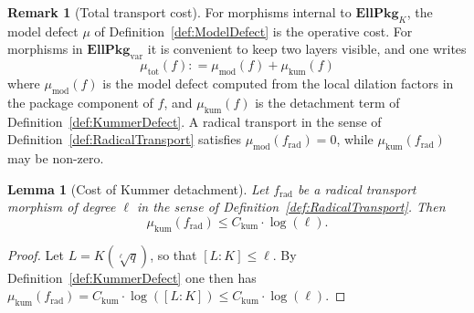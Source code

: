 \documentclass[10pt, reqno]{amsart}
\theoremstyle{plain}
\newtheorem{lemma}[theorem]{Lemma}
\theoremstyle{definition}
\newtheorem{remark}[theorem]{Remark}
\theoremstyle{plain}
\newcommand{\coloneqq}{\mathrel{\mathop:}=}
\begin{document}
\begin{remark}[Total transport cost]\label{rem:TotalTransportCost}
For morphisms internal to $\mathbf{EllPkg}_{K}$, the model defect $\mu$ of Definition~\ref{def:ModelDefect} is the operative cost. For morphisms in $\mathbf{EllPkg}_{\mathrm{var}}$ it is convenient to keep two layers visible, and one writes
\[
  \mu_{\mathrm{tot}}(f) \coloneqq \mu_{\mathrm{mod}}(f) + \mu_{\mathrm{kum}}(f)
\]
where $\mu_{\mathrm{mod}}(f)$ is the model defect computed from the local dilation factors in the package component of $f$, and $\mu_{\mathrm{kum}}(f)$ is the detachment term of Definition~\ref{def:KummerDefect}. A radical transport in the sense of Definition~\ref{def:RadicalTransport} satisfies $\mu_{\mathrm{mod}}(f_{\mathrm{rad}})=0$, while $\mu_{\mathrm{kum}}(f_{\mathrm{rad}})$ may be non-zero.
\end{remark}

\begin{lemma}[Cost of Kummer detachment]\label{lem:KummerDetachmentCost}
Let $f_{\mathrm{rad}}$ be a radical transport morphism of degree $\ell$ in the sense of Definition~\ref{def:RadicalTransport}. Then
\[
  \mu_{\mathrm{kum}}(f_{\mathrm{rad}})
  \le
  C_{\mathrm{kum}} \cdot \log(\ell).
\]
\end{lemma}

\begin{proof}
Let $L=K(\sqrt[\ell]{q})$, so that $[L:K]\le \ell$. By Definition~\ref{def:KummerDefect} one then has $\mu_{\mathrm{kum}}(f_{\mathrm{rad}}) = C_{\mathrm{kum}} \cdot \log([L:K]) \le C_{\mathrm{kum}} \cdot \log(\ell)$.
\end{proof}
\end{document}
